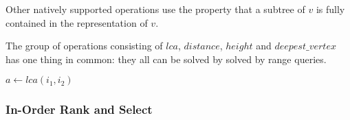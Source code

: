 Other natively supported operations use the property that a subtree of $v$ is fully contained in the representation of $v$.

\begin{algorithmic}
	\State {}
\EndFunction
\end{algorithmic}

\begin{algorithmic}
	\State {}
\EndFunction
\end{algorithmic}

\begin{algorithmic}
	\State {}
\EndFunction
\end{algorithmic}

The group of operations consisting of $lca$, $distance$, $height$ and $deepest\_vertex$ has one thing in common: they all can be solved by solved by range queries.

\begin{algorithmic}
		\State {}
		\State {}
	\Else
		\State {}
	\EndIf
\EndFunction
\end{algorithmic}

\begin{algorithmic}
	\State $a \gets lca(i_1, i_2)$
	\State {}
\EndFunction
\end{algorithmic}

\begin{algorithmic}
	\State {}
\EndFunction
\end{algorithmic}

\begin{algorithmic}
	\State {}
\EndFunction
\end{algorithmic}

\subsubsection{In-Order Rank and Select}


\bigskip

